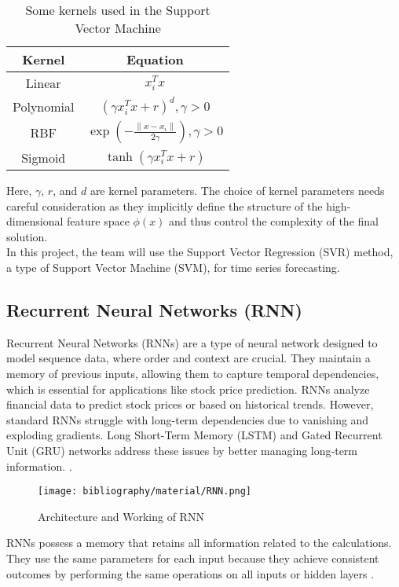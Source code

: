 \documentclass{ieeeojies}
\begin{document}
	\begin{table}[H]
		\centering
		\caption{Some kernels used in the Support Vector Machine}
		\begin{tabular}{|c|c|}
			\hline
			\textbf{Kernel} & \textbf{Equation} \\ \hline
			Linear & ${x_i^T x}$ \\ \hline
			Polynomial & $(\gamma x_i^T x + r)^d, \gamma > 0$ \\ \hline
			RBF & $\exp \left( - \frac{\|x - x_i\|}{2\gamma} \right),  \gamma > 0$ \\ \hline
			Sigmoid & $\tanh(\gamma x_i^T x + r)$ \\ \hline
		\end{tabular}
	\end{table}
 Here, \( \gamma \), \( r \), and \( d \) are kernel parameters. The choice of kernel parameters needs careful consideration as they implicitly define the structure of the high-dimensional feature space \( \phi(x) \) and thus control the complexity of the final solution. \\
 In this project, the team will use the Support Vector Regression (SVR) method, a type of Support Vector Machine (SVM), for time series forecasting.

	\subsection{Recurrent Neural Networks (RNN)}
	Recurrent Neural Networks (RNNs) are a type of neural network designed to model sequence data, where order and context are crucial. They maintain a memory of previous inputs, allowing them to capture temporal dependencies, which is essential for applications like stock price prediction. RNNs analyze financial data to predict stock prices or based on historical trends. However, standard RNNs struggle with long-term dependencies due to vanishing and exploding gradients. Long Short-Term Memory (LSTM) and Gated Recurrent Unit (GRU) networks address these issues by better managing long-term  information. \cite{b11}.
	\begin{figure}[H] %
		\centering
		\texttt{[image: bibliography/material/RNN.png]}
		\caption{Architecture and Working of RNN}
	\end{figure}
	\noindent RNNs possess a memory that retains all information related to the calculations. They use the same parameters for each input because they achieve consistent outcomes by performing the same operations on all inputs or hidden layers \cite{b12}.
	
\end{document}

